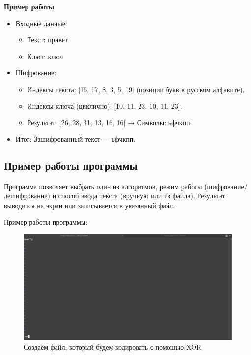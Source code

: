 \documentclass[a4paper, 12pt]{article}
\begin{document}
\textbf{Пример работы}

\begin{itemize}
    \item Входные данные:
    \begin{itemize}
        \item Текст: привет
        \item Ключ: ключ
    \end{itemize}
    \item Шифрование:
    \begin{itemize}
        \item Индексы текста: [16, 17, 8, 3, 5, 19] (позиции букв в русском алфавите).
        \item Индексы ключа (циклично): [10, 11, 23, 10, 11, 23].
        \item Результат: [26, 28, 31, 13, 16, 16] → Символы: ьфчкпп.
    \end{itemize}
    \item Итог: Зашифрованный текст — ьфчкпп.
\end{itemize}

\subsection{Пример работы программы}

Программа позволяет выбрать один из алгоритмов, режим работы (шифрование/дешифрование) и способ ввода текста (вручную или из файла). Результат выводится на экран или записывается в указанный файл.

Пример работы программы:

\begin{figure}[h!]
    \noindent
    \centering
    \includegraphics[width=1\linewidth]{pic_vim_create_file.png}
    \caption{Создаём файл, который будем кодировать с помощью XOR}
\end{figure}
\end{document}
